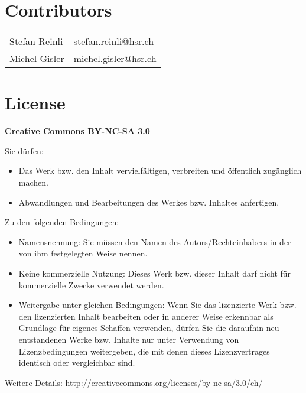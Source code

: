 \section*{Contributors}
\begin{tabular}{ll}
    Stefan Reinli & stefan.reinli@hsr.ch \\ 
    Michel Gisler& michel.gisler@hsr.ch \\ 
\end{tabular} 

{\scriptsize 
\section*{License}
\textbf{Creative Commons BY-NC-SA 3.0}

Sie dürfen:
\begin{itemize}
    \item Das Werk bzw. den Inhalt vervielfältigen, verbreiten und öffentlich
    zugänglich machen.
    \item Abwandlungen und Bearbeitungen des Werkes bzw. Inhaltes anfertigen.
\end{itemize}
Zu den folgenden Bedingungen:
\begin{itemize}
    \item Namensnennung: Sie müssen den Namen des Autors/Rechteinhabers in der von ihm
    festgelegten Weise nennen.
    \item Keine kommerzielle Nutzung: Dieses Werk bzw. dieser Inhalt darf nicht für
    kommerzielle Zwecke verwendet werden.
    \item  Weitergabe unter gleichen Bedingungen: Wenn Sie das lizenzierte Werk bzw. den
    lizenzierten Inhalt bearbeiten oder in anderer Weise erkennbar als Grundlage
    für eigenes Schaffen verwenden, dürfen Sie die daraufhin neu entstandenen
    Werke bzw. Inhalte nur unter Verwendung von Lizenzbedingungen weitergeben,
    die mit denen dieses Lizenzvertrages identisch oder vergleichbar sind.
\end{itemize}
Weitere Details: http://creativecommons.org/licenses/by-nc-sa/3.0/ch/
}
\clearpage
{}%